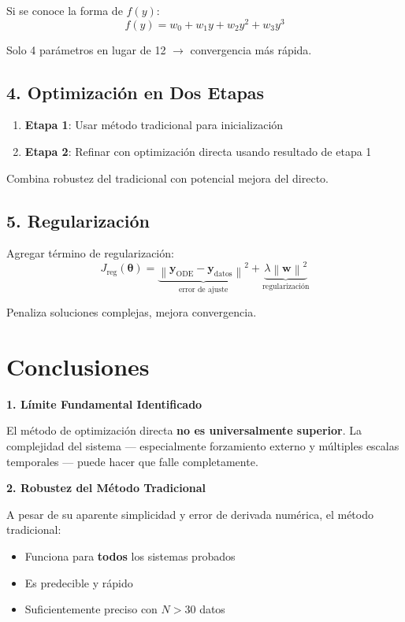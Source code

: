 \documentclass[11pt,a4paper]{article}
\begin{document}
Si se conoce la forma de $f(y)$:
\begin{equation}
f(y) = w_0 + w_1 y + w_2 y^2 + w_3 y^3
\end{equation}

Solo 4 parámetros en lugar de 12 $\rightarrow$ convergencia más rápida.

\subsection{4. Optimización en Dos Etapas}

\begin{enumerate}
\item \textbf{Etapa 1}: Usar método tradicional para inicialización
\item \textbf{Etapa 2}: Refinar con optimización directa usando resultado de etapa 1
\end{enumerate}

Combina robustez del tradicional con potencial mejora del directo.

\subsection{5. Regularización}

Agregar término de regularización:
\begin{equation}
J_{\text{reg}}(\boldsymbol{\theta}) = \underbrace{\left\| \mathbf{y}_{\text{ODE}} - \mathbf{y}_{\text{datos}} \right\|^2}_{\text{error de ajuste}} + \underbrace{\lambda \left\| \mathbf{w} \right\|^2}_{\text{regularización}}
\end{equation}

Penaliza soluciones complejas, mejora convergencia.

\section{Conclusiones}

\textbf{1. Límite Fundamental Identificado}

El método de optimización directa \textbf{no es universalmente superior}. La complejidad del sistema --- especialmente forzamiento externo y múltiples escalas temporales --- puede hacer que falle completamente.

\textbf{2. Robustez del Método Tradicional}

A pesar de su aparente simplicidad y error de derivada numérica, el método tradicional:
\begin{itemize}
\item Funciona para \textbf{todos} los sistemas probados
\item Es predecible y rápido
\item Suficientemente preciso con $N > 30$ datos
\end{itemize}
\end{document}
